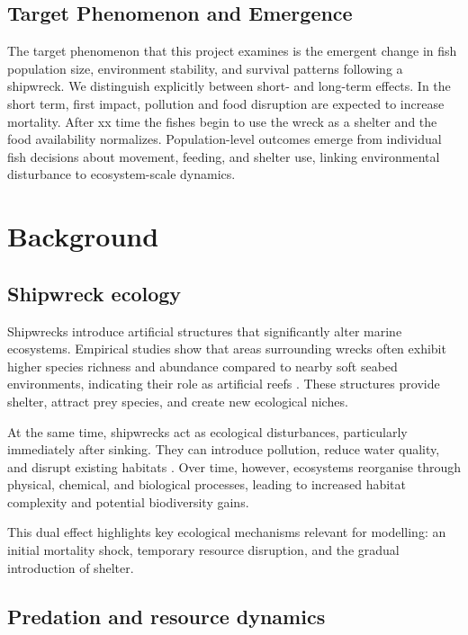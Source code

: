 \documentclass[10pt,a4paper,twocolumn]{article}
\begin{document}
\subsection{Target Phenomenon and Emergence}
The target phenomenon that this project examines is the emergent change in fish population size, environment stability, and survival patterns following a shipwreck. We distinguish explicitly between short- and long-term effects. In the short term, first impact, pollution and food disruption are expected to increase mortality. After xx time the fishes begin to use the wreck as a shelter and the food availability normalizes. Population-level outcomes emerge from individual fish decisions about movement, feeding, and shelter use, linking environmental disturbance to ecosystem-scale dynamics.

\section{Background}

\subsection{Shipwreck ecology}

Shipwrecks introduce artificial structures that significantly alter marine ecosystems. Empirical studies show that areas surrounding wrecks often exhibit higher species richness and abundance compared to nearby soft seabed environments, indicating their role as artificial reefs \citep{effectShipwrecks}. These structures provide shelter, attract prey species, and create new ecological niches.

At the same time, shipwrecks act as ecological disturbances, particularly immediately after sinking. They can introduce pollution, reduce water quality, and disrupt existing habitats \citep{ShipsPaxton}. Over time, however, ecosystems reorganise through physical, chemical, and biological processes, leading to increased habitat complexity and potential biodiversity gains.

This dual effect highlights key ecological mechanisms relevant for modelling: an initial mortality shock, temporary resource disruption, and the gradual introduction of shelter.

\subsection{Predation and resource dynamics}
\end{document}
